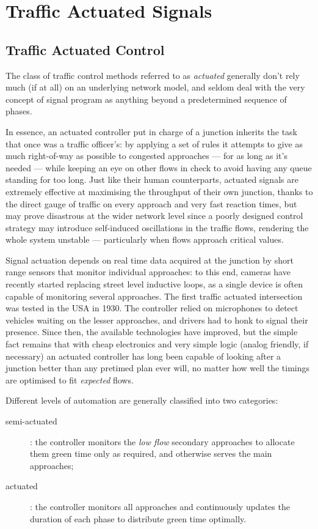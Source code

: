 \section{Traffic Actuated Signals}


\subsection{Traffic Actuated Control}
The class of traffic control methods referred to as \emph{actuated} generally don’t rely much (if
at all) on an underlying network model, and seldom deal with the very concept of signal
program as anything beyond a predetermined sequence of phases.

In essence, an actuated controller put in charge of a junction inherits the task that
once was a traffic officer’s: by applying a set of rules it attempts to give as much right-of-way
as possible to congested approaches — for as long as it’s needed — while keeping an eye on other
flows in check to avoid having any queue standing for too long. Just like their human
counterparts, actuated signals are extremely effective at maximising the throughput of their
own junction, thanks to the direct gauge of traffic on every approach and very fast reaction
times, but may prove disastrous at the wider network level since a poorly designed control
strategy may introduce self-induced oscillations in the traffic flows, rendering the whole
system unstable — particularly when flows approach critical values.

Signal actuation depends on real time data acquired at the junction by short range sensors
that monitor individual approaches: to this end, cameras have recently started replacing street
level inductive loops, as a single device is often capable of monitoring several approaches.
The first traffic actuated intersection was tested in the USA in 1930. The controller relied
on microphones to detect vehicles waiting on the lesser approaches, and drivers had to honk to signal their presence. Since then, the available technologies have improved, but the simple
fact remains that with cheap electronics and very simple logic (analog friendly, if necessary)
an actuated controller has long been capable of looking after a junction better than any pretimed
plan ever will, no matter how well the timings are optimised to fit \emph{expected} flows.

Different levels of automation are generally classified into two categories:
\begin{description}
\item[semi-actuated]: the controller monitors the \emph{low flow} secondary approaches to allocate them green time only as required, and otherwise serves the main approaches;
\item[actuated]: the controller monitors all approaches and continuously updates the duration of each phase to distribute green time optimally.
\end{description}

